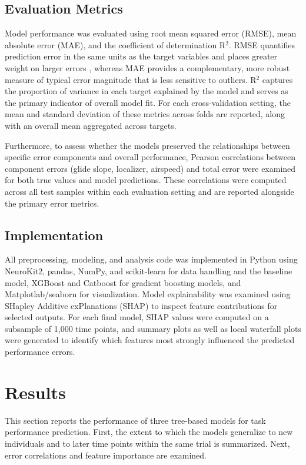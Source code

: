 \documentclass[11pt, a4paper]{article}
\begin{document}
\subsection{Evaluation Metrics}
Model performance was evaluated using root mean squared error (RMSE), mean absolute error (MAE), and the coefficient of determination R$^2$. RMSE quantifies prediction error in the same units as the target variables and places greater weight on larger errors \cite{barry-2025}, whereas MAE provides a complementary, more robust measure of typical error magnitude that is less sensitive to outliers. R$^2$ captures the proportion of variance in each target explained by the model and serves as the primary indicator of overall model fit. For each cross‑validation setting, the mean and standard deviation of these metrics across folds are reported, along with an overall mean aggregated across targets.

Furthermore, to assess whether the models preserved the relationships between specific error components and overall performance, Pearson correlations between component errors (glide slope, localizer, airspeed) and total error were examined for both true values and model predictions. These correlations were computed across all test samples within each evaluation setting and are reported alongside the primary error metrics.

\subsection{Implementation}
All preprocessing, modeling, and analysis code was implemented in Python using NeuroKit2, pandas, NumPy, and scikit-learn for data handling and the baseline model, XGBoost and Catboost for gradient boosting models, and Matplotlab/seaborn for visualization. Model explainability was examined using SHapley Additive exPlanations (SHAP) to inspect feature contributions for selected outputs. For each final model, SHAP values were computed on a subsample of 1,000 time points, and summary plots as well as local waterfall plots were generated to identify which features most strongly influenced the predicted performance errors.

\section{Results}\label{sec:results}
This section reports the performance of three tree-based models for task performance prediction. First, the extent to which the models generalize to new individuals and to later time points within the same trial is summarized. Next, error correlations and feature importance are examined.
\end{document}
